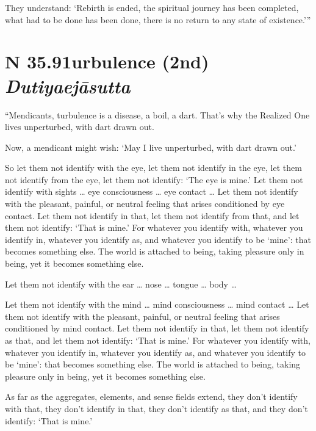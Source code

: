 \documentclass[12pt,openany]{book}%
\newcommand*{\suttatitleacronym}[1]{\smaller[2]{#1}\vspace*{.3em}}
\newcommand*{\suttatitletranslation}[1]{\linebreak{#1}}
\newcommand*{\suttatitleroot}[1]{\linebreak\smaller[2]\itshape{#1}}
\newcommand*{\tocacronym}[1]{\hspace*{-3.3em}{#1}\quad}
\newcommand*{\toctranslation}[1]{#1}
\newcommand*{\tocroot}[1]{(\textit{#1})}
\begin{document}
They understand: ‘Rebirth is ended, the spiritual journey has been completed, what had to be done has been done, there is no return to any state of existence.’” 

%
\section*{{\suttatitleacronym SN 35.91}{\suttatitletranslation Turbulence (2nd) }{\suttatitleroot Dutiyaejāsutta}}
\addcontentsline{toc}{section}{\tocacronym{SN 35.91} \toctranslation{Turbulence (2nd) } \tocroot{Dutiyaejāsutta}}

“Mendicants, turbulence is a disease, a boil, a dart. That’s why the Realized One lives unperturbed, with dart drawn out. 

Now, a mendicant might wish: ‘May I live unperturbed, with dart drawn out.’ 

So let them not identify with the eye, let them not identify in the eye, let them not identify from the eye, let them not identify: ‘The eye is mine.’ Let them not identify with sights … eye consciousness … eye contact … Let them not identify with the pleasant, painful, or neutral feeling that arises conditioned by eye contact. Let them not identify in that, let them not identify from that, and let them not identify: ‘That is mine.’ For whatever you identify with, whatever you identify in, whatever you identify as, and whatever you identify to be ‘mine’: that becomes something else. The world is attached to being, taking pleasure only in being, yet it becomes something else. 

Let them not identify with the ear … nose … tongue … body … 

Let them not identify with the mind … mind consciousness … mind contact … Let them not identify with the pleasant, painful, or neutral feeling that arises conditioned by mind contact. Let them not identify in that, let them not identify as that, and let them not identify: ‘That is mine.’ For whatever you identify with, whatever you identify in, whatever you identify as, and whatever you identify to be ‘mine’: that becomes something else. The world is attached to being, taking pleasure only in being, yet it becomes something else. 

As far as the aggregates, elements, and sense fields extend, they don’t identify with that, they don’t identify in that, they don’t identify as that, and they don’t identify: ‘That is mine.’ 
\end{document}
